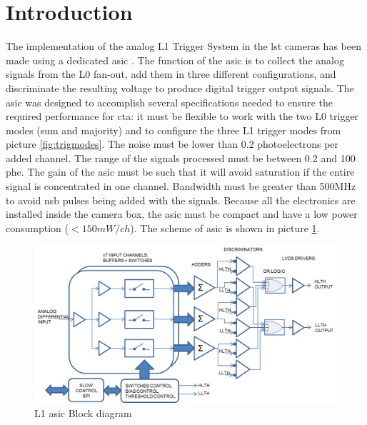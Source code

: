 \documentclass[main.tex]{subfiles}
\begin{document}
\glsresetall

\section{Introduction}

The implementation of the analog L1 Trigger System in the \gls{lst} cameras has been made using a dedicated \gls{asic} \cite{2014ASIC}.
The function of the \gls{asic} is to collect the analog signals from the L0 fan-out, add them in three different configurations, and discriminate the resulting voltage to produce digital trigger output signals.
The \gls{asic} was designed to accomplish several specifications needed to ensure the required performance for \gls{cta}: it must be flexible to work with the two L0 trigger modes (sum and majority) and to configure the three L1 trigger modes from picture \ref{fig:trigmodes}. The noise must be lower than 0.2 photoelectrons per added channel. The range of the signals processed must be between 0.2 and 100 phe. The gain of the \gls{asic} must be such that it will avoid saturation if the entire signal is concentrated in one channel. Bandwidth must be greater than 500MHz to avoid \gls{nsb} pulses being added with the signals. Because all the electronics are installed inside the camera box, the \gls{asic} must be compact and have a low power consumption ($< 150 mW/ch$). The scheme of \gls{asic} is shown in picture \ref{fig:l1diagram}.

\begin{figure}[h]
  \centering
  \includegraphics[width=\textwidth]{./Pictures/L1blockdiagram.pdf}
  \caption{L1 \gls{asic} Block diagram}
  \label{fig:l1diagram}
\end{figure}
\end{document}
